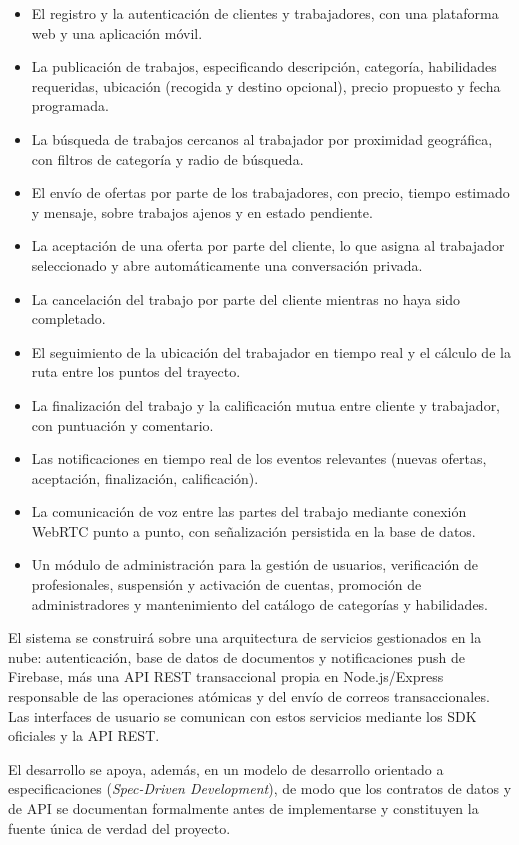 \documentclass[doc,12pt,a4paper]{apa7}
\begin{document}
\begin{itemize}
    \item El registro y la autenticación de clientes y trabajadores, con una plataforma web y una aplicación móvil.
    \item La publicación de trabajos, especificando descripción, categoría, habilidades requeridas, ubicación (recogida y destino opcional), precio propuesto y fecha programada.
    \item La búsqueda de trabajos cercanos al trabajador por proximidad geográfica, con filtros de categoría y radio de búsqueda.
    \item El envío de ofertas por parte de los trabajadores, con precio, tiempo estimado y mensaje, sobre trabajos ajenos y en estado pendiente.
    \item La aceptación de una oferta por parte del cliente, lo que asigna al trabajador seleccionado y abre automáticamente una conversación privada.
    \item La cancelación del trabajo por parte del cliente mientras no haya sido completado.
    \item El seguimiento de la ubicación del trabajador en tiempo real y el cálculo de la ruta entre los puntos del trayecto.
    \item La finalización del trabajo y la calificación mutua entre cliente y trabajador, con puntuación y comentario.
    \item Las notificaciones en tiempo real de los eventos relevantes (nuevas ofertas, aceptación, finalización, calificación).
    \item La comunicación de voz entre las partes del trabajo mediante conexión WebRTC punto a punto, con señalización persistida en la base de datos.
    \item Un módulo de administración para la gestión de usuarios, verificación de profesionales, suspensión y activación de cuentas, promoción de administradores y mantenimiento del catálogo de categorías y habilidades.
\end{itemize}

El sistema se construirá sobre una arquitectura de servicios gestionados en la nube: autenticación, base de datos de documentos y notificaciones push de Firebase, más una API REST transaccional propia en Node.js/Express responsable de las operaciones atómicas y del envío de correos transaccionales. Las interfaces de usuario se comunican con estos servicios mediante los SDK oficiales y la API REST.

El desarrollo se apoya, además, en un modelo de desarrollo orientado a especificaciones (\textit{Spec-Driven Development}), de modo que los contratos de datos y de API se documentan formalmente antes de implementarse y constituyen la fuente única de verdad del proyecto.
\end{document}
